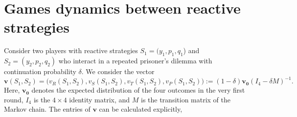\documentclass[11pt]{article}
\theoremstyle{plainCl1}
\theoremstyle{plainCl2}
\begin{document}



\section{Games dynamics between reactive strategies}

Consider two players with reactive strategies $S_1\!=\!(y_1, p_1, q_1$) and $S_2\!=\!(y_2,p_2,q_2)$ who interact in a repeated prisoner's dilemma with continuation probability $\delta$. We consider the vector 
\begin{equation}
\mathbf{v}(S_1,S_2)\!=\!\Big(v_{R}(S_1,S_2),v_{S}(S_1,S_2),v_{T}(S_1,S_2),v_{P}(S_1,S_2)\Big)\!:=\!(1\!-\!\delta)\mathbf{v_0}(I_4-\delta M)^{-1}.
\end{equation}
Here, $\mathbf{v_0}$ denotes the expected distribution of the four outcomes in the very first round, $I_4$ is the $4\!\times\!4$ identity matrix, and $M$ is the transition matrix of the Markov chain. 
The entries of $\mathbf{v}$ can be calculated explicitly,
\end{document}
